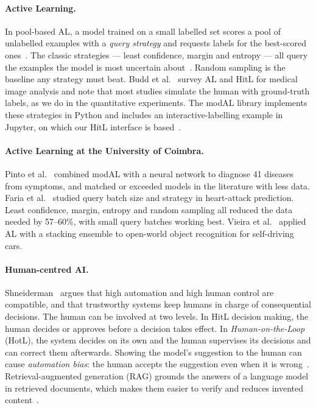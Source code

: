 \documentclass{article}
\begin{document}
\paragraph{Active Learning.}
In pool-based AL, a model trained on a small labelled set scores a pool of unlabelled
examples with a \emph{query strategy} and requests labels for the best-scored
ones~\cite{settles2009survey}. The classic strategies --- least confidence, margin and
entropy --- all query the examples the model is most uncertain
about~\cite{settles2009survey}. Random sampling is the
baseline any strategy must beat. Budd et al.~ survey AL and HitL
for medical image analysis and note that most studies simulate the human with ground-truth
labels, as we do in the quantitative experiments. The modAL library implements these
strategies in Python and includes an interactive-labelling example in Jupyter, on which our
HitL interface is based~\cite{danka2018modal}.

\paragraph{Active Learning at the University of Coimbra.}
Pinto et al.~ combined modAL with a neural network to diagnose 41
diseases from symptoms, and matched or exceeded models in the literature with less data.
Faria et al.~ studied query batch size and strategy in heart-attack
prediction. Least confidence, margin, entropy and random sampling all reduced the data
needed by 57--60\%, with small query batches working best. Vieira et
al.~ applied AL with a stacking ensemble to open-world object
recognition for self-driving cars.

\paragraph{Human-centred AI.}
Shneiderman~ argues that high automation and high human
control are compatible, and that trustworthy systems keep humans in charge of consequential
decisions. The human can be involved at two levels. In
HitL decision making, the human decides or approves before a
decision takes effect. In \emph{Human-on-the-Loop} (HotL), the system decides on its own and
the human supervises its decisions and can correct them afterwards. Showing the model's suggestion to the human can cause
\emph{automation bias}: the human accepts the suggestion even when it is
wrong~\cite{goddard2012automation}. Retrieval-augmented generation (RAG) grounds
the answers of a language model in retrieved documents, which makes them easier to verify
and reduces invented content~\cite{lewis2020rag}.
\end{document}
